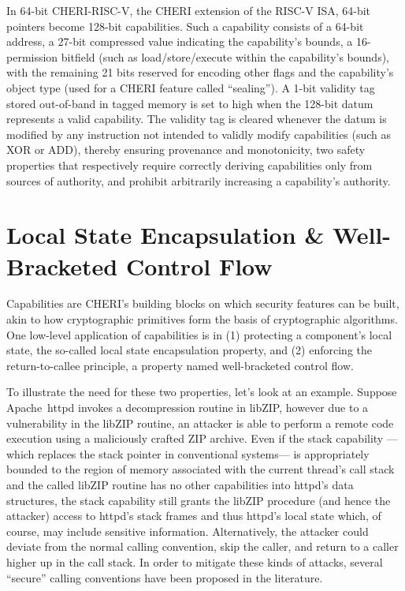 \documentclass[main.tex]{subfiles}
\begin{document}
In 64-bit CHERI-RISC-V, the CHERI extension of the RISC-V ISA, 64-bit pointers become 128-bit capabilities. Such a capability consists of a 64-bit address, a 27-bit compressed value indicating the capability’s bounds, a 16-permission bitfield (such as load/store/execute within the capability’s bounds), with the remaining 21 bits reserved for encoding other flags and the capability’s object type (used for a CHERI feature called “sealing”). A 1-bit validity tag stored out-of-band in tagged memory is set to high when the 128-bit datum represents a valid capability. The validity tag is cleared whenever the datum is modified by any instruction not intended to validly modify capabilities (such as XOR or ADD), thereby ensuring provenance and monotonicity, two safety properties that respectively require correctly deriving capabilities only from sources of authority, and prohibit arbitrarily increasing a capability’s authority.

\section{Local State Encapsulation \& Well-Bracketed Control Flow}
Capabilities are CHERI’s building blocks on which security features can be built, akin to how cryptographic primitives form the basis of cryptographic algorithms. One low-level application of capabilities is in (1) protecting a component's local state, the so-called local state encapsulation property, and (2) enforcing the return-to-callee principle, a property named well-bracketed control flow.

To illustrate the need for these two properties, let’s look at an example. Suppose Apache httpd invokes a decompression routine in libZIP, however due to a vulnerability in the libZIP routine, an attacker is able to perform a remote code execution using a maliciously crafted ZIP archive. Even if the stack capability —which replaces the stack pointer in conventional systems— is appropriately bounded to the region of memory associated with the current thread’s call stack and the called libZIP routine has no other capabilities into httpd’s data structures, the stack capability still grants the libZIP procedure (and hence the attacker) access to httpd’s stack frames and thus httpd’s local state which, of course, may include sensitive information. Alternatively, the attacker could deviate from the normal calling convention, skip the caller, and return to a caller higher up in the call stack. In order to mitigate these kinds of attacks, several “secure” calling conventions have been proposed in the literature.
\end{document}

